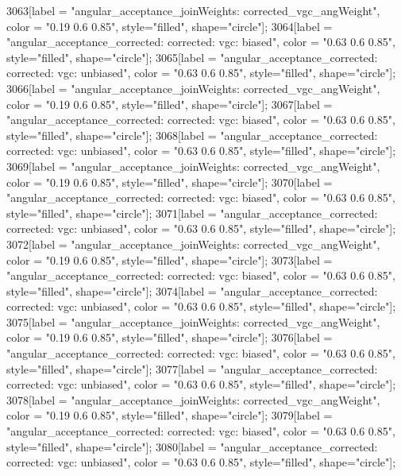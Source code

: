 {	3063[label = "angular_acceptance_joinWeights\nwflag: corrected_vgc_angWeight", color = "0.19 0.6 0.85", style="filled", shape="circle"];
	3064[label = "angular_acceptance_corrected\nangacc: corrected\ncsp: vgc\ntrigger: biased", color = "0.63 0.6 0.85", style="filled", shape="circle"];
	3065[label = "angular_acceptance_corrected\nangacc: corrected\ncsp: vgc\ntrigger: unbiased", color = "0.63 0.6 0.85", style="filled", shape="circle"];
	3066[label = "angular_acceptance_joinWeights\nwflag: corrected_vgc_angWeight", color = "0.19 0.6 0.85", style="filled", shape="circle"];
	3067[label = "angular_acceptance_corrected\nangacc: corrected\ncsp: vgc\ntrigger: biased", color = "0.63 0.6 0.85", style="filled", shape="circle"];
	3068[label = "angular_acceptance_corrected\nangacc: corrected\ncsp: vgc\ntrigger: unbiased", color = "0.63 0.6 0.85", style="filled", shape="circle"];
	3069[label = "angular_acceptance_joinWeights\nwflag: corrected_vgc_angWeight", color = "0.19 0.6 0.85", style="filled", shape="circle"];
	3070[label = "angular_acceptance_corrected\nangacc: corrected\ncsp: vgc\ntrigger: biased", color = "0.63 0.6 0.85", style="filled", shape="circle"];
	3071[label = "angular_acceptance_corrected\nangacc: corrected\ncsp: vgc\ntrigger: unbiased", color = "0.63 0.6 0.85", style="filled", shape="circle"];
	3072[label = "angular_acceptance_joinWeights\nwflag: corrected_vgc_angWeight", color = "0.19 0.6 0.85", style="filled", shape="circle"];
	3073[label = "angular_acceptance_corrected\nangacc: corrected\ncsp: vgc\ntrigger: biased", color = "0.63 0.6 0.85", style="filled", shape="circle"];
	3074[label = "angular_acceptance_corrected\nangacc: corrected\ncsp: vgc\ntrigger: unbiased", color = "0.63 0.6 0.85", style="filled", shape="circle"];
	3075[label = "angular_acceptance_joinWeights\nwflag: corrected_vgc_angWeight", color = "0.19 0.6 0.85", style="filled", shape="circle"];
	3076[label = "angular_acceptance_corrected\nangacc: corrected\ncsp: vgc\ntrigger: biased", color = "0.63 0.6 0.85", style="filled", shape="circle"];
	3077[label = "angular_acceptance_corrected\nangacc: corrected\ncsp: vgc\ntrigger: unbiased", color = "0.63 0.6 0.85", style="filled", shape="circle"];
	3078[label = "angular_acceptance_joinWeights\nwflag: corrected_vgc_angWeight", color = "0.19 0.6 0.85", style="filled", shape="circle"];
	3079[label = "angular_acceptance_corrected\nangacc: corrected\ncsp: vgc\ntrigger: biased", color = "0.63 0.6 0.85", style="filled", shape="circle"];
	3080[label = "angular_acceptance_corrected\nangacc: corrected\ncsp: vgc\ntrigger: unbiased", color = "0.63 0.6 0.85", style="filled", shape="circle"];
}
